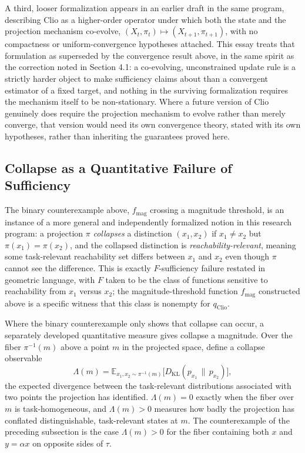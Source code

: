 \documentclass[11pt]{article}
\begin{document}
A third, looser formalization appears in an earlier draft in the same program, describing Clio as a higher-order operator under which both the state and the projection mechanism co-evolve, $(X_t, \pi_t) \mapsto (X_{t+1}, \pi_{t+1})$, with no compactness or uniform-convergence hypotheses attached. This essay treats that formulation as superseded by the convergence result above, in the same spirit as the correction noted in Section 4.1: a co-evolving, unconstrained update rule is a strictly harder object to make sufficiency claims about than a convergent estimator of a fixed target, and nothing in the surviving formalization requires the mechanism itself to be non-stationary. Where a future version of Clio genuinely does require the projection mechanism to evolve rather than merely converge, that version would need its own convergence theory, stated with its own hypotheses, rather than inheriting the guarantees proved here.

\subsection{Collapse as a Quantitative Failure of Sufficiency}

The binary counterexample above, $f_{\mathrm{mag}}$ crossing a magnitude threshold, is an instance of a more general and independently formalized notion in this research program: a projection $\pi$ \emph{collapses} a distinction $(x_1, x_2)$ if $x_1 \neq x_2$ but $\pi(x_1) = \pi(x_2)$, and the collapsed distinction is \emph{reachability-relevant}, meaning some task-relevant reachability set differs between $x_1$ and $x_2$ even though $\pi$ cannot see the difference. This is exactly $F$-sufficiency failure restated in geometric language, with $F$ taken to be the class of functions sensitive to reachability from $x_1$ versus $x_2$; the magnitude-threshold function $f_{\mathrm{mag}}$ constructed above is a specific witness that this class is nonempty for $q_{\mathrm{Clio}}$.

Where the binary counterexample only shows that collapse can occur, a separately developed quantitative measure gives collapse a magnitude. Over the fiber $\pi^{-1}(m)$ above a point $m$ in the projected space, define a collapse observable
\[
\Lambda(m) = \mathbb{E}_{x_1, x_2 \sim \pi^{-1}(m)}\bigl[D_{\mathrm{KL}}(p_{x_1} \,\|\, p_{x_2})\bigr],
\]
the expected divergence between the task-relevant distributions associated with two points the projection has identified. $\Lambda(m) = 0$ exactly when the fiber over $m$ is task-homogeneous, and $\Lambda(m) > 0$ measures how badly the projection has conflated distinguishable, task-relevant states at $m$. The counterexample of the preceding subsection is the case $\Lambda(m) > 0$ for the fiber containing both $x$ and $y = \alpha x$ on opposite sides of $\tau$.
\end{document}
